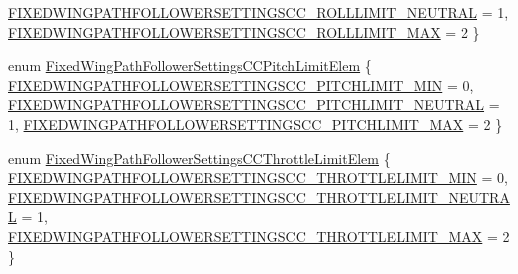 \begin{DoxyCompactItemize}
\hyperlink{group___fixed_wing_path_follower_settings_c_c_ggad2a8198985d78fc16e01d365a925b171a114a0cc5c7e0fd41f9b149a4b7b019b2}{\-F\-I\-X\-E\-D\-W\-I\-N\-G\-P\-A\-T\-H\-F\-O\-L\-L\-O\-W\-E\-R\-S\-E\-T\-T\-I\-N\-G\-S\-C\-C\-\_\-\-R\-O\-L\-L\-L\-I\-M\-I\-T\-\_\-\-N\-E\-U\-T\-R\-A\-L} = 1, 
\hyperlink{group___fixed_wing_path_follower_settings_c_c_ggad2a8198985d78fc16e01d365a925b171a842c256bfbd50beb2aabdca41ab3dd3b}{\-F\-I\-X\-E\-D\-W\-I\-N\-G\-P\-A\-T\-H\-F\-O\-L\-L\-O\-W\-E\-R\-S\-E\-T\-T\-I\-N\-G\-S\-C\-C\-\_\-\-R\-O\-L\-L\-L\-I\-M\-I\-T\-\_\-\-M\-A\-X} = 2
 \}
\item 
enum \hyperlink{group___fixed_wing_path_follower_settings_c_c_gaaead2e3634827a950e65ba179eca83b2}{\-Fixed\-Wing\-Path\-Follower\-Settings\-C\-C\-Pitch\-Limit\-Elem} \{ \hyperlink{group___fixed_wing_path_follower_settings_c_c_ggaaead2e3634827a950e65ba179eca83b2a7fede6c83efa102aa34f6de8482ced04}{\-F\-I\-X\-E\-D\-W\-I\-N\-G\-P\-A\-T\-H\-F\-O\-L\-L\-O\-W\-E\-R\-S\-E\-T\-T\-I\-N\-G\-S\-C\-C\-\_\-\-P\-I\-T\-C\-H\-L\-I\-M\-I\-T\-\_\-\-M\-I\-N} = 0, 
\hyperlink{group___fixed_wing_path_follower_settings_c_c_ggaaead2e3634827a950e65ba179eca83b2ac87335fd6b1e445adbf3d8880e38b271}{\-F\-I\-X\-E\-D\-W\-I\-N\-G\-P\-A\-T\-H\-F\-O\-L\-L\-O\-W\-E\-R\-S\-E\-T\-T\-I\-N\-G\-S\-C\-C\-\_\-\-P\-I\-T\-C\-H\-L\-I\-M\-I\-T\-\_\-\-N\-E\-U\-T\-R\-A\-L} = 1, 
\hyperlink{group___fixed_wing_path_follower_settings_c_c_ggaaead2e3634827a950e65ba179eca83b2aded9e7fe037206d9995040d19bf77efa}{\-F\-I\-X\-E\-D\-W\-I\-N\-G\-P\-A\-T\-H\-F\-O\-L\-L\-O\-W\-E\-R\-S\-E\-T\-T\-I\-N\-G\-S\-C\-C\-\_\-\-P\-I\-T\-C\-H\-L\-I\-M\-I\-T\-\_\-\-M\-A\-X} = 2
 \}
\item 
enum \hyperlink{group___fixed_wing_path_follower_settings_c_c_gac1bfcdb3d3307e2cf908dc452080cedb}{\-Fixed\-Wing\-Path\-Follower\-Settings\-C\-C\-Throttle\-Limit\-Elem} \{ \hyperlink{group___fixed_wing_path_follower_settings_c_c_ggac1bfcdb3d3307e2cf908dc452080cedba12fcc5de5b7c16157e086484e4b7044c}{\-F\-I\-X\-E\-D\-W\-I\-N\-G\-P\-A\-T\-H\-F\-O\-L\-L\-O\-W\-E\-R\-S\-E\-T\-T\-I\-N\-G\-S\-C\-C\-\_\-\-T\-H\-R\-O\-T\-T\-L\-E\-L\-I\-M\-I\-T\-\_\-\-M\-I\-N} = 0, 
\hyperlink{group___fixed_wing_path_follower_settings_c_c_ggac1bfcdb3d3307e2cf908dc452080cedba203c81d5f2488ea9d224078bb9243c49}{\-F\-I\-X\-E\-D\-W\-I\-N\-G\-P\-A\-T\-H\-F\-O\-L\-L\-O\-W\-E\-R\-S\-E\-T\-T\-I\-N\-G\-S\-C\-C\-\_\-\-T\-H\-R\-O\-T\-T\-L\-E\-L\-I\-M\-I\-T\-\_\-\-N\-E\-U\-T\-R\-A\-L} = 1, 
\hyperlink{group___fixed_wing_path_follower_settings_c_c_ggac1bfcdb3d3307e2cf908dc452080cedba6703e708177f31b4ad5c0ddbb6bd8279}{\-F\-I\-X\-E\-D\-W\-I\-N\-G\-P\-A\-T\-H\-F\-O\-L\-L\-O\-W\-E\-R\-S\-E\-T\-T\-I\-N\-G\-S\-C\-C\-\_\-\-T\-H\-R\-O\-T\-T\-L\-E\-L\-I\-M\-I\-T\-\_\-\-M\-A\-X} = 2
 \}
\end{DoxyCompactItemize}

